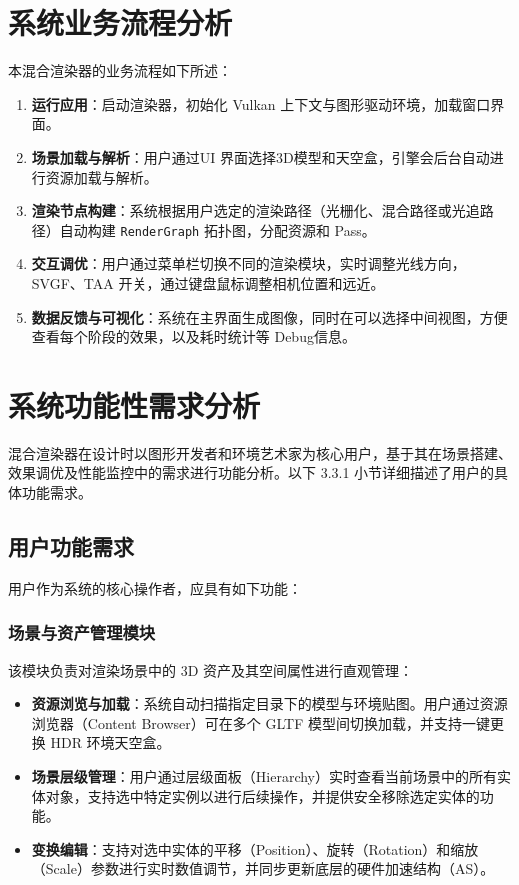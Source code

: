 \section{系统业务流程分析}
本混合渲染器的业务流程如下所述：
\begin{enumerate}
    \item \textbf{运行应用}：启动渲染器，初始化 Vulkan 上下文与图形驱动环境，加载窗口界面。
    \item \textbf{场景加载与解析}：用户通过UI 界面选择3D模型和天空盒，引擎会后台自动进行资源加载与解析。
    \item \textbf{渲染节点构建}：系统根据用户选定的渲染路径（光栅化、混合路径或光追路径）自动构建 \texttt{RenderGraph} 拓扑图，分配资源和 Pass。
    \item \textbf{交互调优}：用户通过菜单栏切换不同的渲染模块，实时调整光线方向， SVGF、TAA 开关，通过键盘鼠标调整相机位置和远近。
    \item \textbf{数据反馈与可视化}：系统在主界面生成图像，同时在可以选择中间视图，方便查看每个阶段的效果，以及耗时统计等 Debug信息。
\end{enumerate}

\section{系统功能性需求分析}
混合渲染器在设计时以图形开发者和环境艺术家为核心用户，基于其在场景搭建、效果调优及性能监控中的需求进行功能分析。以下 3.3.1 小节详细描述了用户的具体功能需求。

\subsection{用户功能需求}
用户作为系统的核心操作者，应具有如下功能：

\subsubsection{场景与资产管理模块}
该模块负责对渲染场景中的 3D 资产及其空间属性进行直观管理：
\begin{itemize}
    \item \textbf{资源浏览与加载}：系统自动扫描指定目录下的模型与环境贴图。用户通过资源浏览器（Content Browser）可在多个 GLTF 模型间切换加载，并支持一键更换 HDR 环境天空盒。
    \item \textbf{场景层级管理}：用户通过层级面板（Hierarchy）实时查看当前场景中的所有实体对象，支持选中特定实例以进行后续操作，并提供安全移除选定实体的功能。
    \item \textbf{变换编辑}：支持对选中实体的平移（Position）、旋转（Rotation）和缩放（Scale）参数进行实时数值调节，并同步更新底层的硬件加速结构（AS）。
\end{itemize}

